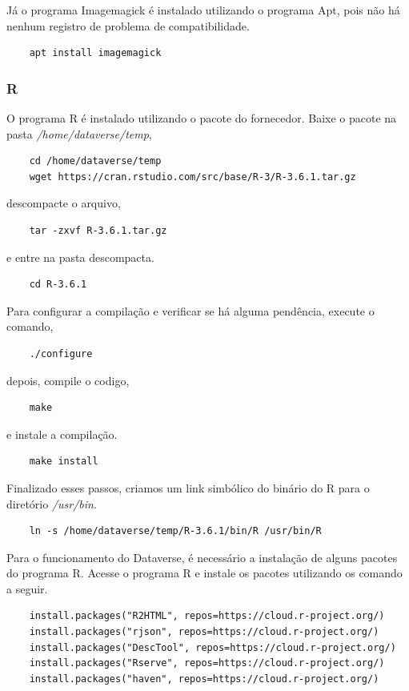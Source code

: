 \documentclass[12pt,hidelinks]{article}
\begin{document}
        Já o programa Imagemagick é instalado utilizando o programa Apt, pois não há nenhum registro de problema de compatibilidade.
        \begin{verbatim}
    apt install imagemagick
        \end{verbatim}
        
        \subsubsection{R}
        
        O programa R é instalado utilizando o pacote do fornecedor. Baixe o pacote na pasta \textit{/home/dataverse/temp},
        \begin{verbatim}
    cd /home/dataverse/temp
    wget https://cran.rstudio.com/src/base/R-3/R-3.6.1.tar.gz
        \end{verbatim}
        descompacte o arquivo,
        \begin{verbatim}
    tar -zxvf R-3.6.1.tar.gz
        \end{verbatim}
        e entre na pasta descompacta.
        \begin{verbatim}
    cd R-3.6.1
        \end{verbatim}

        Para configurar a compilação e verificar se há alguma pendência, execute o comando,
        \begin{verbatim}
    ./configure
        \end{verbatim}
        depois, compile o codigo,
        \begin{verbatim}
    make
        \end{verbatim}
        e instale a compilação.
        \begin{verbatim}
    make install
        \end{verbatim}
        Finalizado esses passos, criamos um link simbólico do binário do R para o diretório \textit{/usr/bin}.
        \begin{verbatim}
    ln -s /home/dataverse/temp/R-3.6.1/bin/R /usr/bin/R
        \end{verbatim}
        
        Para o funcionamento do Dataverse, é necessário a instalação de alguns pacotes do programa R. Acesse o programa R e instale os pacotes utilizando os comando a seguir.
        \begin{verbatim}
    install.packages("R2HTML", repos=https://cloud.r-project.org/)
    install.packages("rjson", repos=https://cloud.r-project.org/)
    install.packages("DescTool", repos=https://cloud.r-project.org/)
    install.packages("Rserve", repos=https://cloud.r-project.org/)
    install.packages("haven", repos=https://cloud.r-project.org/)
        \end{verbatim}
        
\end{document}
